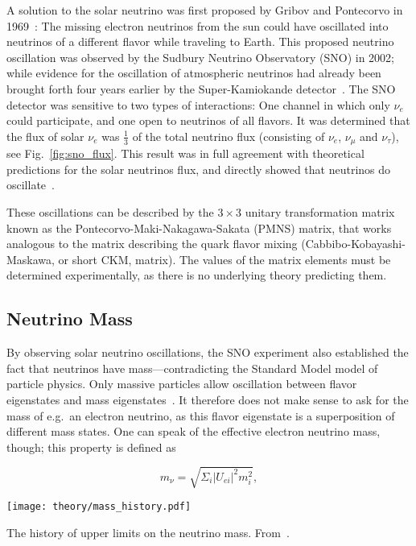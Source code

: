 A solution to the solar neutrino was first proposed by Gribov and Pontecorvo in 1969~: The missing electron neutrinos from the sun could have oscillated into neutrinos of a different flavor while traveling to Earth. This proposed neutrino oscillation was observed by the Sudbury Neutrino Observatory (SNO) in 2002; while evidence for the oscillation of atmospheric neutrinos had already been brought forth four years earlier by the Super-Kamiokande detector~. The SNO detector was sensitive to two types of interactions: One channel in which only $\nu_e$ could participate, and one open to neutrinos of all flavors. It was determined that the flux of solar $\nu_e$ was $\frac{1}{3}$ of the total neutrino flux (consisting of $\nu_e$, $\nu_\mu$ and $\nu_\tau$), see Fig.~\ref{fig:sno_flux}. This result was in full agreement with theoretical predictions for the solar neutrinos flux, and directly showed that neutrinos do oscillate~.

These oscillations can be described by the $3\times3$ unitary transformation matrix known as the Pontecorvo-Maki-Nakagawa-Sakata (PMNS) matrix, that works analogous to the matrix describing the quark flavor mixing (Cabbibo-Kobayashi-Maskawa, or short CKM, matrix). The values of the matrix elements must be determined experimentally, as there is no underlying theory predicting them.

\subsection{Neutrino Mass}
By observing solar neutrino oscillations, the SNO experiment also established the fact that neutrinos have mass---contradicting the Standard Model model of particle physics. Only massive particles allow oscillation between flavor eigenstates and mass eigenstates~. It therefore does not make sense to ask for the mass of e.g.\ an electron neutrino, as this flavor eigenstate is a superposition of different mass states. One can speak of the effective electron neutrino mass, though; this property is defined as

\begin{equation}\label{pmns}
  m_\nu = \sqrt{ \Sigma_i |U_{ei}|^2 m_i^2 },
\end{equation}

\begin{marginfigure}
  \texttt{[image: theory/mass\_history.pdf]}
  \caption[Neutrino mass upper limit history]{The history of upper limits on the neutrino mass. From~\cite{Aker2022}.}
\end{marginfigure}

